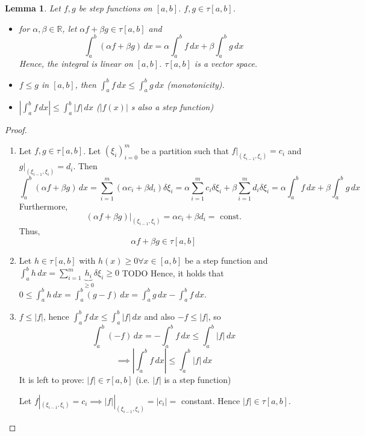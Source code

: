 \documentclass{article}
\newtheorem{lemma}{Lemma}  \numberwithin{lemma}{section}
\newcommand{\card}[1]{\left|#1\right|}
\begin{document}
\begin{lemma} %
  Let $f,g$ be step functions on $[a,b]$. $f,g \in \tau[a,b]$.
  \begin{itemize}
    \item
      for $\alpha, \beta \in \mathbb R$, let $\alpha f + \beta g \in \tau[a,b]$ and
      \[ \int_a^b (\alpha f + \beta g) \, dx = \alpha \int_a^bf \, dx + \beta \int_a^b g \, dx \]
      Hence, the integral is linear on $[a,b]$. $\tau[a,b]$ is a vector space.
    \item $f \leq g$ in $[a,b]$, then $\int_a^b f \, dx \leq \int_a^b g \, dx$ (monotonicity).
    \item $\card{\int_a^b f \, dx} \leq \int_a^b \card{f} \, dx$ ($\card{f(x)}$ s also a step function)
  \end{itemize}
\end{lemma}

\begin{proof}
  \begin{enumerate}
    \item
      Let $f,g \in \tau[a,b]$. Let $(\xi_i)_{i=0}^m$ be a partition such that
      $f|_{(\xi_{i-1},\xi_i)} = c_i$ and $g|_{(\xi_{i-1},\xi_i)} = d_i$.
      Then
      \[
        \int_a^b (\alpha f + \beta g) \, dx = \sum_{i=1}^m (\alpha c_i + \beta d_i) \delta \xi_i
        = \alpha \sum_{i=1}^m c_i \delta \xi_i + \beta \sum_{i=1}^m d_i \delta \xi_i
        = \alpha \int_a^b f \, dx + \beta \int_a^b g \, dx
      \]
      Furthermore,
      \[ (\alpha f + \beta g)|_{(\xi_{i-1},\xi_i)} = \alpha c_i + \beta d_i = \text{ const.} \]
      Thus,
      \[ \alpha f + \beta g \in \tau[a,b] \]
    \item
      Let $h \in \tau[a,b]$ with $h(x) \geq 0 \forall x \in [a,b]$ be a step function
      and $\int_a^b h \, dx = \sum_{i=1}^m \underbrace{h_i}_{\geq 0} \delta \xi_i \geq 0$
      TODO
      Hence, it holds that $0 \leq \int_a^b h \, dx = \int_a^b (g - f) \, dx = \int_a^b g \, dx - \int_a^b f \, dx$.
    \item
      $f \leq \card{f}$, hence $\int_a^b f \, dx \leq \int_a^b \card{f} \, dx$ and also
      $-f \leq \card{f}$, so
      \[ \int_a^b (-f) \, dx = -\int_a^b f \, dx \leq \int_a^b \card{f} \, dx \]
      \[ \implies \card{\int_a^b f \, dx} \leq \int_a^b \card{f} \, dx \]
      It is left to prove: $\card{f} \in \tau[a,b]$ (i.e. $\card{f}$ is a step function)

      Let $f|_{(\xi_{i-1}, \xi_i)} = c_i \implies \card{f}|_{(\xi_{i-1}, \xi_i)} = \card{c_i} = $ constant.
      Hence $\card{f} \in \tau[a,b]$.
  \end{enumerate}
\end{proof}
\end{document}
